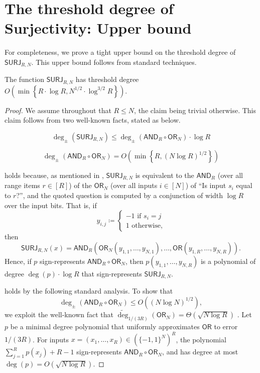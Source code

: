 \documentclass{toc}
\newcommand{\SURJ}{\mathsf{ SURJ}}
\newcommand{\OR}{\mathsf{ OR}}
\newcommand{\bits}{\{-1,1\}}
\newcommand{\adeg}{\widetilde{\operatorname{deg}}}
\newcommand{\AND}{\mathsf{AND}}
\begin{document}
\section{The threshold degree of Surjectivity: Upper bound}
\label{app:ub}
For completeness, we prove a tight upper bound on the threshold degree of $\SURJ_{R, N}$.
This upper bound follows from standard techniques.
\begin{claim}
	The function $\SURJ_{R, N}$ has threshold degree $O\left(\min\left\{R  \cdot \log R, N^{1/2} \cdot \log^{3/2} R\right\}\right)$.
\end{claim}
\begin{proof}
	We assume throughout that $R \leq N$, the claim being trivial otherwise.
	This claim follows from two well-known facts, stated as   below.
	
	\begin{equation} \label{nomoremore}\deg_{\pm}(\SURJ_{R, N}) \leq \deg_{\pm}(\AND_R \circ \OR_N) \cdot \log R \end{equation}
	
	\begin{equation} \label{nomoremore2} \deg_{\pm}(\AND_R \circ \OR_N) = O\left(\min\left\{R, (N \log R)^{1/2}\right\}\right) \end{equation}
%
	
	 holds because, as mentioned in , 
	$\SURJ_{R, N}$ is equivalent to the $\AND_R$ (over all range items $r \in [R]$) of the $\OR_N$ (over all inputs $i \in [N]$) of ``Is input $s_i$ equal to $r$?'', and the quoted question is computed by a conjunction of width $\log R$ over the input bits. 
	That is, if $$y_{i,j} \coloneqq  \begin{cases} -1 \text{ if } s_i=j \\ 1 \text{ otherwise,}\end{cases}$$
	then $$\SURJ_{R, N}(x) = \AND_R(\OR_N(y_{1, 1} ,\dots, y_{N, 1}), \dots, \OR(y_{1, R}, \dots, y_{N, R})).$$
	Hence, if $p$ sign-represents $\AND_R \circ \OR_N$, then $p(y_{1, 1}, \dots,  y_{N, R})$ is a polynomial of degree $\deg(p) \cdot \log R$
	that sign-represents $\SURJ_{R, N}$. 
	
	 holds by the following standard analysis. 
	To show that $$\deg_{\pm}(\AND_R \circ \OR_N) \leq O((N \log N)^{1/2}),$$ 
	we exploit the well-known fact that $\adeg_{1/(3R)}(\OR_N) = \Theta(\sqrt{N \log R})$ \cite{kahn, buhrman1999bounds}. 
	Let $p$ be a minimal degree polynomial that uniformly approximates $\OR$ to error $1/(3R)$.
	For inputs $x=(x_1, \dots, x_R) \in \left(\bits^{N}\right)^{R}$, 
	the polynomial $\sum_{j=1}^{R} p(x_j) + R-1$ sign-represents $\AND_R \circ \OR_N$,
	and has degree at most $\deg(p) = O(\sqrt{N \log R})$. 
	

\end{proof}
\end{document}
